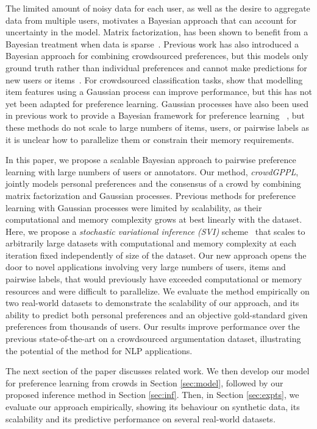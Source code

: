 The limited amount of noisy data for each user,
as well as the desire to aggregate data from multiple users,
motivates a Bayesian approach that can account for uncertainty in the model.
Matrix factorization, has been shown to benefit from a Bayesian treatment when data is sparse~\citep{salakhutdinov2008bayesian}. 
Previous work has also introduced a Bayesian approach for combining crowdsourced preferences, but this models only ground truth rather than individual preferences and cannot make predictions for new users or items~\citep{chen2013pairwise}.
For crowdsourced classification tasks, \citet{simpson2017bayesian} show that modelling item features using a Gaussian process can improve performance, but this has not yet been adapted for preference learning.
Gaussian processes have also been used in previous work to provide a Bayesian framework for preference learning
~\citep{chu2005preference,houlsby2012collaborative,khan2014scalable}, 
but these methods do not scale to large numbers of items, users, or
pairwise labels as it is unclear how to parallelize them or constrain their memory requirements.

In this paper, we propose a scalable Bayesian approach to pairwise preference learning with 
large numbers of users or annotators. %
Our method, \emph{crowdGPPL},
 jointly models %
personal preferences and the consensus of a crowd by combining 
matrix factorization and Gaussian processes. %
Previous methods for preference learning with Gaussian processes were limited by scalability,
as their computational and memory complexity grows at best linearly with the dataset. 
Here, we propose a 
\emph{stochastic variational inference (SVI)} scheme~\citep{hoffman2013stochastic}
that scales to arbitrarily large datasets 
with computational and memory complexity at each iteration fixed independently of size of the dataset.
Our new approach opens the door to novel applications involving very large numbers of users, items and pairwise labels,
that would previously have exceeded computational or memory resources and were difficult to parallelize.
We evaluate the method empirically on two real-world datasets to demonstrate 
the scalability of our approach,
and its ability to predict both personal preferences and an objective gold-standard given 
preferences from thousands of users.
Our results improve performance over the previous state-of-the-art \citep{simpson2018finding} on a crowdsourced argumentation dataset, illustrating the potential of the method for NLP applications.

The next section of the paper discusses related work.
We then develop our model for preference learning from crowds in Section \ref{sec:model},
followed by our proposed inference method in Section \ref{sec:inf}.
Then, in Section \ref{sec:expts}, 
we evaluate our approach empirically, showing its behaviour on synthetic data, 
its scalability and its predictive performance on several real-world datasets.
